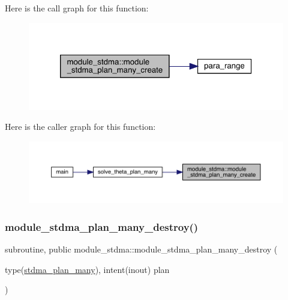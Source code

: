 Here is the call graph for this function\+:\nopagebreak
\begin{figure}[H]
\begin{center}
\leavevmode
\includegraphics[width=320pt]{namespacemodule__stdma_ac68f17b987232c3daacbb844bd52d67e_cgraph}
\end{center}
\end{figure}
Here is the caller graph for this function\+:\nopagebreak
\begin{figure}[H]
\begin{center}
\leavevmode
\includegraphics[width=350pt]{namespacemodule__stdma_ac68f17b987232c3daacbb844bd52d67e_icgraph}
\end{center}
\end{figure}
\mbox{\label{namespacemodule__stdma_a4ff32ed335c7df121dbb0be635a29287}} 
\subsubsection{\texorpdfstring{module\_stdma\_plan\_many\_destroy()}{module\_stdma\_plan\_many\_destroy()}}
{\footnotesize\ttfamily subroutine, public module\+\_\+stdma\+::module\+\_\+stdma\+\_\+plan\+\_\+many\+\_\+destroy (\begin{DoxyParamCaption}\item[{type(\mbox{\hyperlink{structmodule__stdma_1_1stdma__plan__many}{stdma\+\_\+plan\+\_\+many}}), intent(inout)}]{plan }\end{DoxyParamCaption})}



